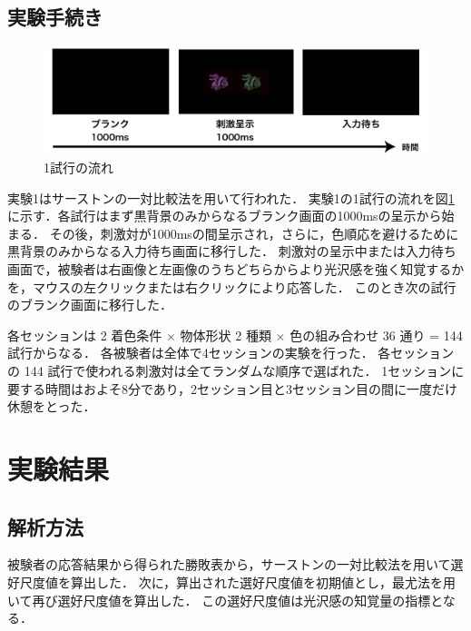         \subsection{実験手続き}

            \begin{figure}[h]
                \centering
                \includegraphics[width=14.0cm]{./img/ex1_procedure.png}
                \caption{1試行の流れ}
                \label{ex1_procedure}
            \end{figure}

            実験1はサーストンの一対比較法を用いて行われた．
            実験1の1試行の流れを図\ref{ex1_procedure}に示す．各試行はまず黒背景のみからなるブランク画面の1000msの呈示から始まる．
            その後，刺激対が1000msの間呈示され，さらに，色順応を避けるために黒背景のみからなる入力待ち画面に移行した．
            刺激対の呈示中または入力待ち画面で，被験者は右画像と左画像のうちどちらからより光沢感を強く知覚するかを，マウスの左クリックまたは右クリックにより応答した．
            このとき次の試行のブランク画面に移行した．

            各セッションは 2 着色条件 $\times$ 物体形状 2 種類 $\times$ 色の組み合わせ 36 通り = 144 試行からなる．
            各被験者は全体で4セッションの実験を行った．
            各セッションの 144 試行で使われる刺激対は全てランダムな順序で選ばれた．
            1セッションに要する時間はおよそ8分であり，2セッション目と3セッション目の間に一度だけ休憩をとった．



    \section{実験結果}
        \subsection{解析方法}
            被験者の応答結果から得られた勝敗表から，サーストンの一対比較法を用いて選好尺度値を算出した．
            次に，算出された選好尺度値を初期値とし，最尤法を用いて再び選好尺度値を算出した．
            この選好尺度値は光沢感の知覚量の指標となる．
            

